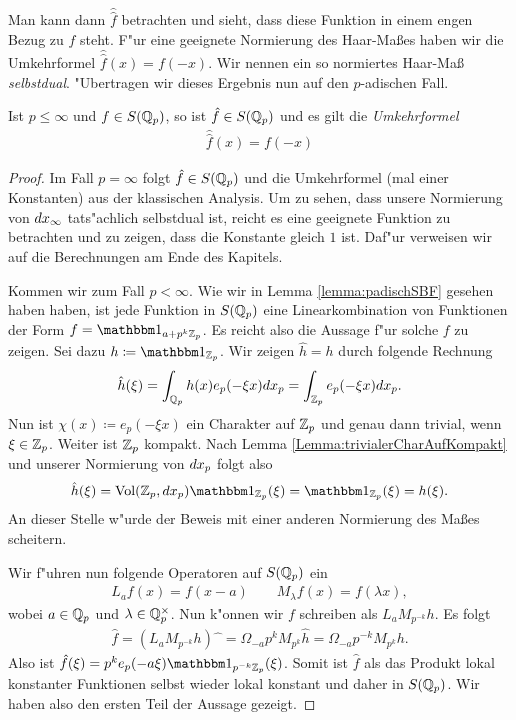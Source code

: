 		Man kann dann $\hat{\hat{f}}$ betrachten und sieht, dass diese Funktion in einem engen Bezug zu $f$ steht. 
		F"ur eine geeignete Normierung des Haar-Maßes haben wir die Umkehrformel $\hat{\hat{f}}(x)=f(-x)$.
		Wir nennen ein so normiertes Haar-Maß \emph{selbstdual}.
		"Ubertragen wir dieses Ergebnis nun auf den $p$-adischen Fall.
		\begin{satz}\label{satz:lokal:umkehrformel}
			Ist $p\leq\infty$ und $f\in S({\mathbb{Q}_p})$, so ist $\hat{f} \in S({\mathbb{Q}_p})$ und es gilt die \emph{Umkehrformel}
			\begin{align*}
				\hat{\hat{f}}(x) = f(-x)
			\end{align*}
		\end{satz}
		\begin{proof}
			Im Fall $p=\infty$ folgt $\hat{f} \in S({\mathbb{Q}_p})$ und die Umkehrformel (mal einer Konstanten) aus der klassischen Analysis.
			Um zu sehen, dass unsere Normierung von $d{x}_\infty$ tats"achlich selbstdual ist, reicht es eine geeignete Funktion zu betrachten und zu zeigen, dass die Konstante gleich $1$ ist. 
			Daf"ur verweisen wir auf die Berechnungen am Ende des Kapitels.
			
			Kommen wir zum Fall $p<\infty$. 
			Wie wir in Lemma \ref{lemma:padischSBF} gesehen haben haben, ist jede Funktion in $S({\mathbb{Q}_p})$ eine Linearkombination von Funktionen der Form $f = \ind_{a+p^k\Zp}$. 
			Es reicht also die Aussage f"ur solche $f$ zu zeigen.
			Sei dazu $h\coloneqq  \ind_{\Zp}$. Wir zeigen $\hat{h} = h$ durch folgende Rechnung
			\begin{align*}
				\hat{h}(\xi) = \int_{\mathbb{Q}_p} h(x) e_p (-\xi x) d{x}_p = \int_{\mathbb{Z}_p} e_p(-\xi x) d{x}_p.
			\end{align*}
			Nun ist $\chi(x)\coloneqq e_p(-\xi x)$ ein Charakter auf ${\mathbb{Z}_p}$ und genau dann trivial, wenn $\xi\in{\mathbb{Z}_p}$. 
			Weiter ist ${\mathbb{Z}_p}$ kompakt. 
			Nach Lemma \ref{Lemma:trivialerCharAufKompakt} und unserer Normierung von $d{x}_p$ folgt also
			\begin{align*}
				\hat{h}(\xi) = \Vol(\Zp, \dxp) \ind_\Zp(\xi) = \ind_\Zp(\xi) = h(\xi).
			\end{align*}
			An dieser Stelle w"urde der Beweis mit einer anderen Normierung des Maßes scheitern.
			
			Wir f"uhren nun folgende Operatoren auf $S({\mathbb{Q}_p})$ ein
			\begin{align*}
				L_a f(x) = f(x-a)\qquad M_\lambda f(x) = f(\lambda x),
			\end{align*}
			wobei $a \in {\mathbb{Q}_p}$ und $\lambda \in \mathbb{Q}_p^\times$. 
			Nun k"onnen wir $f$ schreiben als $L_a M_{p^{-k}}h$. 
			Es folgt
			\begin{align*}
				\hat{f} = (L_a M_{p^{-k}}h)\widehat{\phantom{x}} = \Omega_{-a}p^{k}M_{p^k}\hat{h}=\Omega_{-a}p^{-k}M_{p^k}h.
			\end{align*}
			Also ist $\hat{f} (\xi) = p^k e_p(-a\xi)\ind_{p^{-k}\Zp}(\xi)$. 
			Somit ist $\hat{f}$ als das Produkt lokal konstanter Funktionen selbst wieder lokal konstant und daher in $S({\mathbb{Q}_p})$. 
			Wir haben also den ersten Teil der Aussage gezeigt.
			

\end{proof}
